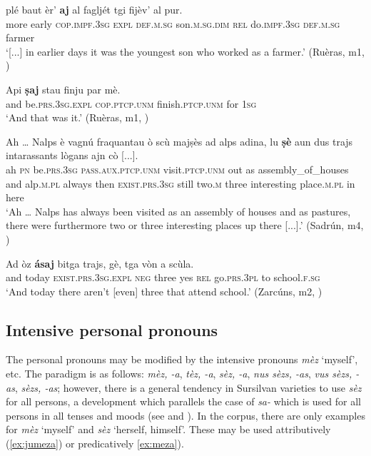 \ea\label{ex:expl:6}
\gll  [...] plé baut èr’ \textbf{aj} al fagljét tgi fijèv’ al pur.  \\
{} more early \textsc{cop.impf.3sg} \textsc{expl} \textsc{def.m.sg}  son.\textsc{m.sg.dim} \textsc{rel} do.\textsc{impf.3sg} \textsc{def.m.sg} farmer \\
\glt `[...] in earlier days it was the youngest son who worked as a farmer.' (Ruèras, m1, )
\z

\ea
\label{ex:expl:7}
\gll  Api \textbf{ṣaj} stau finju par mè.\\
and be.\textsc{prs.3sg.expl} \textsc{cop.ptcp.unm} finish.\textsc{ptcp.unm} for \textsc{1sg}\\
\glt `And that was it.' (Ruèras, m1, )
\z

\ea
\label{ex:expl:8}
\gll Ah … Nalps è vagnú fraquantau ò scù majṣès ad alps adina, lu \textbf{ṣè} aun dus trajs intarassants lògans ajn cò [...].\\
ah {} \textsc{pn}  be.\textsc{prs.3sg} \textsc{pass.aux.ptcp.unm} visit.\textsc{ptcp.unm} out as assembly\_of\_houses and alp.\textsc{m.pl} always then \textsc{exist.prs.3sg} still two.\textsc{m} three interesting place.\textsc{m.pl} in here \\
\glt `Ah … Nalps has always been visited as an assembly of houses and as pastures, there were furthermore two or three interesting places up there [...].' (Sadrún, m4, )
\z

\ea
\label{ex:expl:9}
\gll    Ad òz \textbf{ásaj} bitga trajs, gè, tga vòn a scùla.\\
and today \textsc{exist.prs.3sg.expl} \textsc{neg} three yes \textsc{rel} go.\textsc{prs.3pl} to school.\textsc{f.sg}\\
\glt `And today there aren’t [even] three that attend school.' (Zarcúns, m2, )
\z


\subsection {Intensive personal pronouns}\label{3.6.3}
The personal pronouns may be modified by the intensive pronouns \textit{mèz} `myself', etc. The paradigm is as follows: \textit{mèz, -a}, \textit{tèz, -a}, \textit{sèz, -a}, \textit{nus sèzs, -as}, \textit{vus sèzs, -as}, \textit{sèzs, -as}; however, there is a general tendency in Sursilvan varieties to use \textit{sèz} for all persons, a development which parallels the case of  \textit{sa-} which is used for all persons in all tenses and moods (see  and ). In the corpus, there are only examples for \textit{mèz} `myself' and \textit{sèz} `herself, himself'. These may be used attributively (\ref{ex:jumeza}) or predicatively \ref{ex:meza}).

